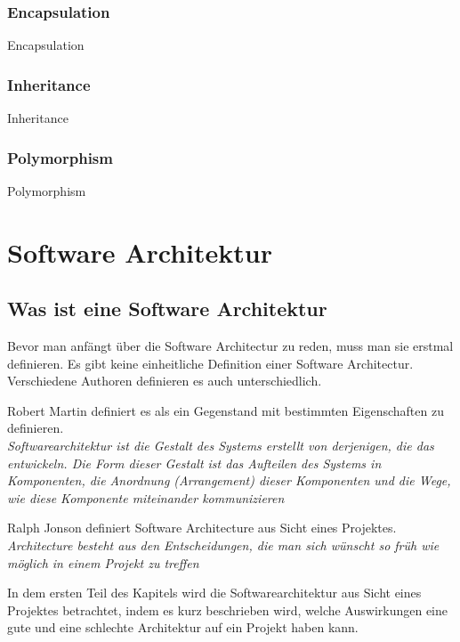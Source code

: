 \documentclass{article}
\begin{document}
        \subsubsection{Encapsulation}
            {Encapsulation}

        \subsubsection{Inheritance}
            {Inheritance}

        \subsubsection{Polymorphism}
            {Polymorphism}

\newpage

\section{Software Architektur}

    \subsection{Was ist eine Software Architektur}

    Bevor man anfängt über die Software Architectur zu reden, muss man sie erstmal definieren.
    Es gibt keine einheitliche Definition einer Software Architectur. Verschiedene Authoren definieren es auch unterschiedlich.

    Robert Martin definiert es als ein Gegenstand mit bestimmten Eigenschaften zu definieren.\\
    \textit{Softwarearchitektur ist die Gestalt des Systems erstellt von derjenigen, die das entwickeln. 
    Die Form dieser Gestalt ist das Aufteilen des Systems in Komponenten, die Anordnung (Arrangement) dieser Komponenten und die Wege, 
    wie diese Komponente miteinander kommunizieren} \cite[136]{cleanArchitecture}
    
    Ralph Jonson definiert Software Architecture aus Sicht eines Projektes.\\
    \textit{Architecture besteht aus den Entscheidungen, die man sich wünscht so früh wie möglich in einem Projekt zu treffen}
    \cite{MF_WhatIsSA}

    In dem ersten Teil des Kapitels wird die Softwarearchitektur aus Sicht eines Projektes betrachtet, 
    indem es kurz beschrieben wird, welche Auswirkungen eine gute und eine schlechte Architektur auf ein Projekt haben kann.
\end{document}
